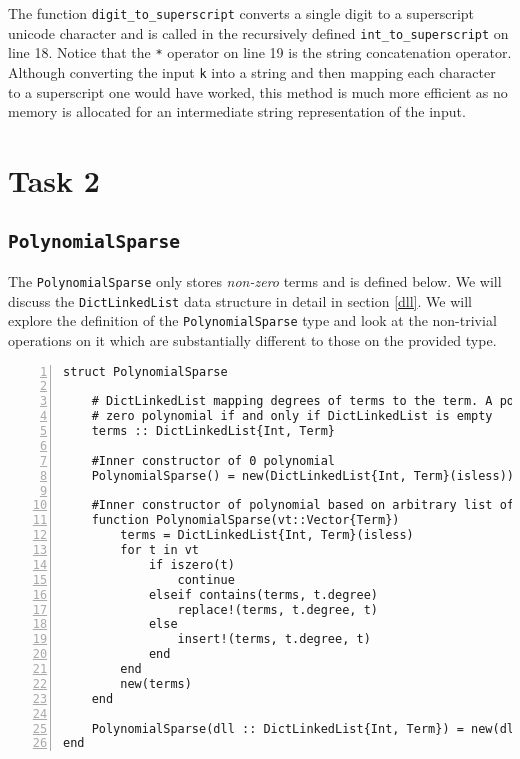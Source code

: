 \documentclass{article}
\theoremstyle{plain}
\numberwithin{theorem}{section}
\numberwithin{example}{section}
\theoremstyle{definition}
\numberwithin{definition}{section}
\begin{document}
The function \texttt{digit\_to\_superscript} converts a single digit to a
superscript unicode character and is called in the recursively defined
\texttt{int\_to\_superscript} on line 18. Notice that the \texttt{*} operator on
line 19 is the string concatenation operator. Although converting the input
\texttt{k} into a string and then mapping each character to a superscript one
would have worked, this method is much more efficient as no memory is allocated
for an intermediate string representation of the input.

\bigbreak

\section{Task 2}
\subsection{\texttt{PolynomialSparse}}
The \texttt{PolynomialSparse} only stores \emph{non-zero} terms and is defined
below. We will discuss the \texttt{DictLinkedList} data structure in detail in
section \ref{dll}. We will explore the definition of the
\texttt{PolynomialSparse} type and look at the non-trivial operations on it
which are substantially different to those on the provided type.

\begin{codebox}
    \begin{Verbatim}[numbers=left,xleftmargin=5mm]
struct PolynomialSparse

    # DictLinkedList mapping degrees of terms to the term. A polynomial is the
    # zero polynomial if and only if DictLinkedList is empty
    terms :: DictLinkedList{Int, Term}
    
    #Inner constructor of 0 polynomial
    PolynomialSparse() = new(DictLinkedList{Int, Term}(isless))

    #Inner constructor of polynomial based on arbitrary list of terms
    function PolynomialSparse(vt::Vector{Term})
        terms = DictLinkedList{Int, Term}(isless)
        for t in vt
            if iszero(t)
                continue
            elseif contains(terms, t.degree)
                replace!(terms, t.degree, t)
            else
                insert!(terms, t.degree, t)
            end
        end
        new(terms)
    end

    PolynomialSparse(dll :: DictLinkedList{Int, Term}) = new(dll)
end
    \end{Verbatim}
\end{codebox}
\end{document}
